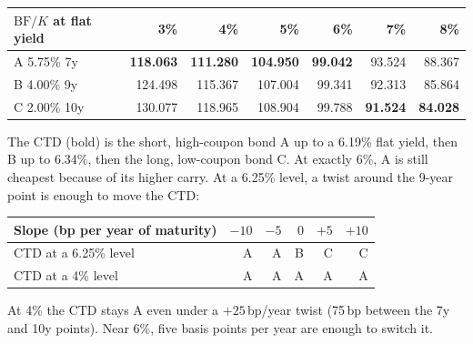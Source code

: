 \documentclass[11pt]{article}
\newcommand{\BF}{\mathrm{BF}}
\begin{document}
\begin{center}
\begin{tabular}{lrrrrrr}
\toprule
$\BF/K$ at flat yield & 3\% & 4\% & 5\% & 6\% & 7\% & 8\% \\
\midrule
A 5.75\% 7y & \textbf{118.063} & \textbf{111.280} & \textbf{104.950} & \textbf{99.042} & 93.524 & 88.367 \\
B 4.00\% 9y & 124.498 & 115.367 & 107.004 & 99.341 & 92.313 & 85.864 \\
C 2.00\% 10y & 130.077 & 118.965 & 108.904 & 99.788 & \textbf{91.524} & \textbf{84.028} \\
\bottomrule
\end{tabular}
\end{center}
The CTD (bold) is the short, high-coupon bond A up to a 6.19\% flat yield, then B up to 6.34\%, then the long, low-coupon bond C. At exactly 6\%, A is still cheapest because of its higher carry. At a 6.25\% level, a twist around the 9-year point is enough to move the CTD:
\begin{center}
\begin{tabular}{lrrrrr}
\toprule
Slope (bp per year of maturity) & $-10$ & $-5$ & $0$ & $+5$ & $+10$ \\
\midrule
CTD at a 6.25\% level & A & A & B & C & C \\
CTD at a 4\% level & A & A & A & A & A \\
\bottomrule
\end{tabular}
\end{center}
At 4\% the CTD stays A even under a $+25$\,bp/year twist (75\,bp between the 7y and 10y points). Near 6\%, five basis points per year are enough to switch it.
\end{document}
